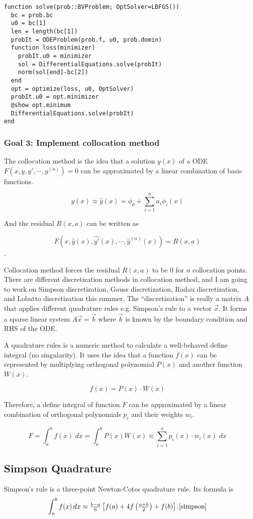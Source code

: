 \documentclass[a4paper,12pt,onecolumn]{article}
\begin{document}
\begin{lstlisting}[mathescape=true]
function solve(prob::BVProblem; OptSolver=LBFGS())
  bc = prob.bc
  u0 = bc[1]
  len = length(bc[1])
  probIt = ODEProblem(prob.f, u0, prob.domin)
  function loss(minimizer)
    probIt.u0 = minimizer
    sol = DifferentialEquations.solve(probIt)
    norm(sol[end]-bc[2])
  end
  opt = optimize(loss, u0, OptSolver)
  probIt.u0 = opt.minimizer
  @show opt.minimum
  DifferentialEquations.solve(probIt)
end
\end{lstlisting}

\subsubsection{Goal 3: Implement collocation method}
The collocation method is the idea that a solution $y(x)$ of a ODE $F(x, y, y', \cdots, y^{(n)}) = 0$
can be approximated by a linear combination of basis functions.

\[y(x) \approx \hat{y}(x) = \phi_0 + \sum_{i=1}^na_i\phi_i(x)\]

And the residual $R(x,a)$ can be written as

\[F(x, \hat{y}(x), \hat{y'}(x), \cdots, \hat{y}^{(n)}(x)) = R(x,a)\].

Collocation method forces the residual $R(x,a)$ to be $0$ for $n$ collocation points.
There are different discretization methods in collocation method, and I am going to work on
Simpson discretization, Gauss discretization, Radau discretization, and Lobatto
discretization this summer. The ``discretization'' is really a matrix $A$ that applies different
quadrature rules e.g. Simpson's rule to a vector $\vec{x}$. It forms a sparse linear system
$A\vec{x}=\vec{b}$ where $\vec{b}$ is known by the boundary condition and RHS of the ODE.

A quadrature rules is a numeric method to calculate a well-behaved define integral (no singularity).
It uses the idea that a function $f(x)$ can be represented by multiplying orthogonal polynomial $P(x)$
and another function $W(x)$.

\[f(x) = P(x)\cdot W(x)\]

Therefore, a define integral of function $F$ can be approximated by a linear combination of orthogonal
polynomials $p_i$ and their weights $w_i$.

\[F = \int_{a}^{b}f(x)\;dx = \int_{a}^{b}P(x)W(x) \approx \sum_{i=1}^{n}p_i(x)\cdot w_i(x)\;dx\]

\subsection{Simpson Quadrature}
Simpson's rule is a three-point Newton-Cotes quadrature rule. Its formula is
\[\int _{a}^{b}f(x)\,dx\approx {\tfrac {b-a}{6}}\left[f(a)+4f\left({\tfrac {a+b}{2}}\right)+f(b)\right].
\cite{simpson}\]
\end{document}
